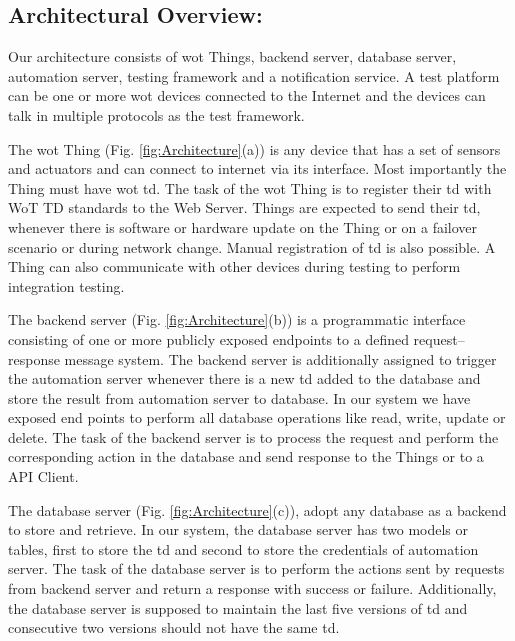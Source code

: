 \documentclass[conference]{IEEEtran}
\theoremstyle{definition}
\begin{document}
\subsection{Architectural Overview: }
Our architecture consists of \ac{wot} Things, backend server, database server, automation server, testing framework and a notification service. 
A test platform can be one or more \ac{wot} devices connected to the Internet and the devices can talk in multiple protocols as the test framework. 

The \ac{wot} Thing (Fig. \ref{fig:Architecture}(a)) is any device that has a set of sensors and actuators and can connect to internet via its interface. 
Most importantly the Thing must have \ac{wot} \ac{td}. 
The task of the \ac{wot} Thing is to register their \ac{td} with WoT TD standards to the Web Server. 
Things are expected to send their \ac{td}, whenever there is software or hardware update on the Thing or on a failover scenario or during network change.
Manual registration of \ac{td} is also possible.
A Thing can also communicate with other devices during testing to perform integration testing.

The backend server (Fig. \ref{fig:Architecture}(b)) is a programmatic interface consisting of one or more publicly exposed endpoints to a defined request–response message system. 
The backend server is additionally assigned to trigger the automation server whenever there is a new \ac{td} added to the database and store the result from automation server to database.
In our system we have exposed end points to perform all database operations like read, write, update or delete. 
The task of the backend server is to process the request and perform the corresponding action in the database and send response to the Things or to a API Client.

The database server (Fig. \ref{fig:Architecture}(c)), adopt any database as a backend to store and retrieve.  
In our system, the database server has two models or tables, first to store the \ac{td} and second to store the credentials of automation server. 
The task of the database server is to perform the actions sent by requests from backend server and return a response with success or failure. 
Additionally, the database server is supposed to maintain the last five versions of \ac{td} and consecutive two versions should not have the same \ac{td}. 
\end{document}
